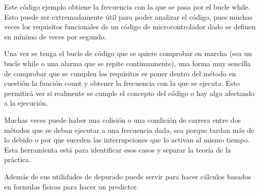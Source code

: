 \documentclass{report}
\begin{document}
Este código ejemplo obtiene la frecuencia con la que se pasa por el bucle while. Esto puede ser extremadamente útil para poder analizar el código, pues muchas veces los requisitos funcionales de un código de microcontrolador dado se definen en mínimo de veces por segundo. \par
Una vez se tenga el bucle de código que se quiere comprobar en marcha (sea un bucle while o una alarma que se repite continuamente), una forma muy sencilla de comprobar que se cumplen los requisitos es poner dentro del método en cuestión la función count y obtener la frecuencia con la que se ejecuta. Esto permitirá ver si realmente se cumple el concepto del código o hay algo afectando a la ejecución. \par
Muchas veces puede haber una colisión o una condición de carrera entre dos métodos que se deban ejecutar a una frecuencia dada, sea porque tardan más de lo debido o por que suceden las interrupciones que lo activan al mismo tiempo. Esta herramienta está para identificar esos casos y separar la teoría de la práctica. 
\par \vspace{0.3cm}
Además de sus utilidades de depurado puede servir para hacer cálculos basados en formulas físicas para hacer un predictor. 
\end{document}
